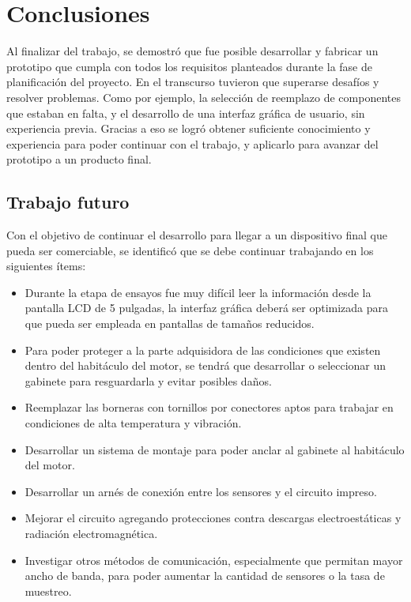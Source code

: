 \chapter{Conclusiones}

\label{Chapter5}

Al finalizar del trabajo, se demostró que fue posible desarrollar y fabricar un prototipo que cumpla con todos los requisitos planteados durante la fase de planificación del proyecto. En el transcurso tuvieron que superarse desafíos y resolver problemas. Como por ejemplo, la selección de reemplazo de componentes que estaban en falta, y el desarrollo de una interfaz gráfica de usuario, sin experiencia previa. Gracias a eso se logró obtener suficiente conocimiento y experiencia para poder continuar con el trabajo, y aplicarlo para avanzar del prototipo a un producto final.

\section{Trabajo futuro}
Con el objetivo de continuar el desarrollo para llegar a un dispositivo final que pueda ser comerciable, se identificó que se debe continuar trabajando en los siguientes ítems:

\begin{itemize}
\item Durante la etapa de ensayos fue muy difícil leer la información desde la pantalla LCD de 5 pulgadas, la interfaz gráfica deberá ser optimizada para que pueda ser empleada en pantallas de tamaños reducidos.

\item Para poder proteger a la parte adquisidora de las condiciones que existen dentro del habitáculo del motor, se tendrá que desarrollar o seleccionar un gabinete para resguardarla y evitar posibles daños.

\item Reemplazar las borneras con tornillos por conectores aptos para trabajar en condiciones de alta temperatura y vibración.

\item Desarrollar un sistema de montaje para poder anclar al gabinete al habitáculo del motor.

\item Desarrollar un arnés de conexión entre los sensores y el circuito impreso.

\item Mejorar el circuito agregando protecciones contra descargas electroestáticas y radiación electromagnética.

\item Investigar otros métodos de comunicación, especialmente que permitan mayor ancho de banda, para poder aumentar la cantidad de sensores o la tasa de muestreo.

\end{itemize}



